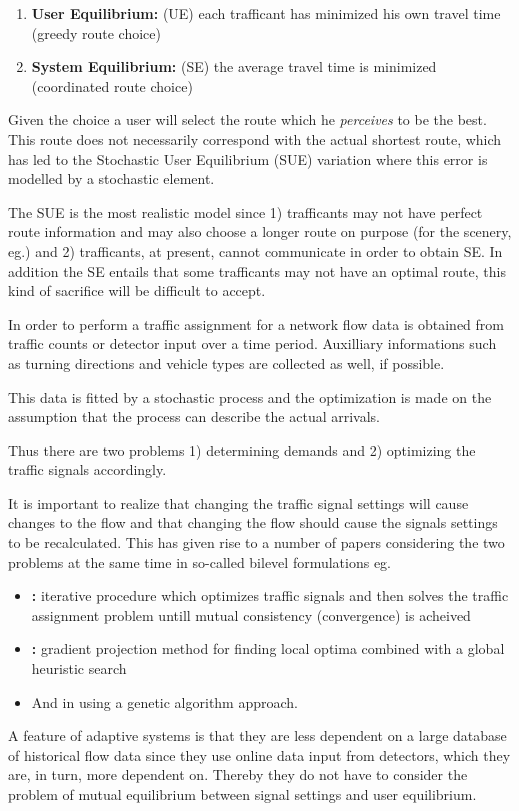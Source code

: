 \begin{enumerate}
\item \textbf{User Equilibrium:} (UE) each trafficant has minimized his own travel time (greedy route choice)
\item \textbf{System Equilibrium:} (SE) the average travel time is minimized (coordinated route choice)
\end{enumerate}

Given the choice a user will select the route which he \textit{perceives} to be the best. This route does not necessarily correspond with the actual shortest route, which has led to the Stochastic User Equilibrium (SUE) variation where this error is modelled by a stochastic element. 

The SUE is the most realistic model since 1) trafficants may not have perfect route information and may also choose a longer route on purpose (for the scenery, eg.) and 2) trafficants, at present, cannot communicate in order to obtain SE. In addition the SE entails that some trafficants may not have an optimal route, this kind of sacrifice will be difficult to accept.

In order to perform a traffic assignment for a network flow data is obtained from traffic counts or detector input over a time period. Auxilliary informations such as turning directions and vehicle types are collected as well, if possible. 

This data is fitted by a stochastic process and the optimization is made on the assumption that the process can describe the actual arrivals.

Thus there are two problems 1) determining demands and 2) optimizing the traffic signals accordingly.

It is important to realize that changing the traffic signal settings will cause changes to the flow and that changing the flow should cause the signals settings to be recalculated. This has given rise to a number of papers considering the two problems at the same time in so-called bilevel formulations eg. 
\begin{itemize}
\item \textbf{\cite{mc}:} iterative procedure which optimizes traffic signals and then solves the traffic assignment problem untill mutual consistency (convergence) is acheived
\item \textbf{\cite{34}:} gradient projection method for finding local optima combined with a global heuristic search
\item And in \textbf{\cite{2}} using a genetic algorithm approach.
\end{itemize}

A feature of adaptive systems is that they are less dependent on a large database of historical flow data since they use online data input from detectors, which they are, in turn, more dependent on. Thereby they do not have to consider the problem of mutual equilibrium between signal settings and user equilibrium.
